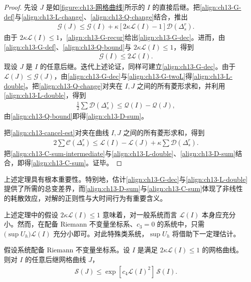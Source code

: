 \documentclass[../../main.tex]{subfiles}
\begin{document}
\begin{proof}
先设 $J$ 是如\cref{figure:ch13-网格曲线}所示的 $I$ 的直接后继。把\eqref{align:ch13-G-def}与\eqref{align:ch13-L-change}、\eqref{align:ch13-Q-change}结合，推出
\begin{align}
\mathscr{G}(J)\leqslant\mathscr{G}(I)+\kappa[2\kappa\mathscr{L}(I)-1]\mathscr{D}(\Delta_s^r).
\label{align:ch13-G-recur}
\end{align}
由于 $2\kappa\mathscr{L}(I)\leqslant1$，\eqref{align:ch13-G-recur}给出\eqref{align:ch13-G-dec}。进而，由\eqref{align:ch13-G-def}、\eqref{align:ch13-Q-bound}与 $2\kappa\mathscr{L}(I)\leqslant1$，得到
\begin{align}
\mathscr{G}(I)\leqslant2\mathscr{L}(I).
\label{align:ch13-G-twoL}
\end{align}
现设 $J$ 是 $I$ 的任意后继。迭代上述论证，同样可建立\eqref{align:ch13-G-dec}。由于 $\mathscr{L}(J)\leqslant\mathscr{G}(J)$，由\eqref{align:ch13-G-dec}与\eqref{align:ch13-G-twoL}得\eqref{align:ch13-L-double}。把\eqref{align:ch13-Q-change}对夹在 $I,J$ 之间的所有菱形求和，并利用\eqref{align:ch13-L-double}，得到
\begin{align}
\frac12\sum\mathscr{D}(\Delta_s^r)\leqslant\mathscr{Q}(I)-\mathscr{Q}(J),
\label{align:ch13-D-sum-intermediate}
\end{align}
由\eqref{align:ch13-Q-bound}即得\eqref{align:ch13-D-sum}。

把\eqref{align:ch13-cancel-est}对夹在曲线 $I,J$ 之间的所有菱形求和，得到
\begin{align}
2\sum\mathscr{C}(\Delta_s^r)\leqslant\mathscr{L}(I)-\mathscr{L}(J)+\kappa\sum\mathscr{D}(\Delta_s^r).
\label{align:ch13-C-sum-intermediate}
\end{align}
把\eqref{align:ch13-C-sum-intermediate}与\eqref{align:ch13-L-double}、\eqref{align:ch13-D-sum}结合，即得\eqref{align:ch13-C-sum}。证毕。
\end{proof}

上述定理具有根本重要性。特别地，估计\eqref{align:ch13-G-dec}与\eqref{align:ch13-L-double}提供了所需的总变差界，而\eqref{align:ch13-D-sum}与\eqref{align:ch13-C-sum}体现了非线性的耗散效应，对解的正则性与大时间行为有重要含义。

上述定理中的假设 $2\kappa\mathscr{L}(I)\leqslant1$ 意味着，对一般系统而言 $\mathscr{L}(I)$ 本身应充分小。然而，在配备 Riemann 不变量坐标系、$c_3=0$ 的系统中，只需 $\big(\sup U_h\big)\mathscr{L}(I)$ 充分小即可。对此特殊类系统，$\sup U_h$ 将借助下一定理估计。

\begin{theorem}[上确界的指数界]\label{theorem:ch13-sup指数界}
假设系统配备 Riemann 不变量坐标系。设 $I$ 是满足 $2\kappa\mathscr{L}(I)\leqslant1$ 的网格曲线。则对 $I$ 的任意后继网格曲线 $J$，
\begin{align}
\mathscr{S}(J)\leqslant\exp[c_4\mathscr{L}(I)^2]\,\mathscr{S}(I).
\label{align:ch13-S-exp}
\end{align}
\end{theorem}
\end{document}
